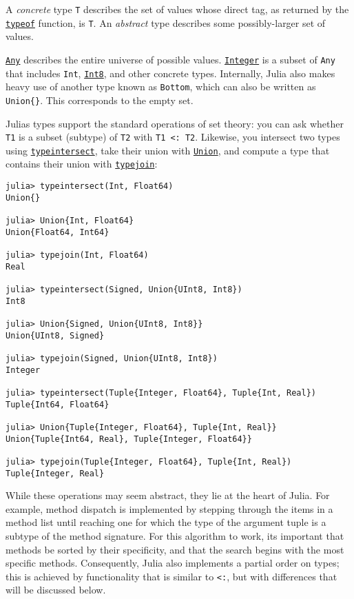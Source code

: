 A \emph{concrete} type \texttt{T} describes the set of values whose direct tag, as returned by the \hyperlink{13440452181855594120}{\texttt{typeof}} function, is \texttt{T}. An \emph{abstract} type describes some possibly-larger set of values.



\hyperlink{15014186392807667022}{\texttt{Any}} describes the entire universe of possible values. \hyperlink{8469131683393450448}{\texttt{Integer}} is a subset of \texttt{Any} that includes \texttt{Int}, \hyperlink{5857518405103968275}{\texttt{Int8}}, and other concrete types. Internally, Julia also makes heavy use of another type known as \texttt{Bottom}, which can also be written as \texttt{Union\{\}}. This corresponds to the empty set.



Julia{\textquotesingle}s types support the standard operations of set theory: you can ask whether \texttt{T1} is a {\textquotedbl}subset{\textquotedbl} (subtype) of \texttt{T2} with \texttt{T1 <: T2}. Likewise, you intersect two types using \hyperlink{1869272868531275554}{\texttt{typeintersect}}, take their union with \hyperlink{5087820771052303592}{\texttt{Union}}, and compute a type that contains their union with \hyperlink{6895589781245489183}{\texttt{typejoin}}:




\begin{verbatim}
julia> typeintersect(Int, Float64)
Union{}

julia> Union{Int, Float64}
Union{Float64, Int64}

julia> typejoin(Int, Float64)
Real

julia> typeintersect(Signed, Union{UInt8, Int8})
Int8

julia> Union{Signed, Union{UInt8, Int8}}
Union{UInt8, Signed}

julia> typejoin(Signed, Union{UInt8, Int8})
Integer

julia> typeintersect(Tuple{Integer, Float64}, Tuple{Int, Real})
Tuple{Int64, Float64}

julia> Union{Tuple{Integer, Float64}, Tuple{Int, Real}}
Union{Tuple{Int64, Real}, Tuple{Integer, Float64}}

julia> typejoin(Tuple{Integer, Float64}, Tuple{Int, Real})
Tuple{Integer, Real}
\end{verbatim}



While these operations may seem abstract, they lie at the heart of Julia.  For example, method dispatch is implemented by stepping through the items in a method list until reaching one for which the type of the argument tuple is a subtype of the method signature. For this algorithm to work, it{\textquotesingle}s important that methods be sorted by their specificity, and that the search begins with the most specific methods. Consequently, Julia also implements a partial order on types; this is achieved by functionality that is similar to \texttt{<:}, but with differences that will be discussed below.



